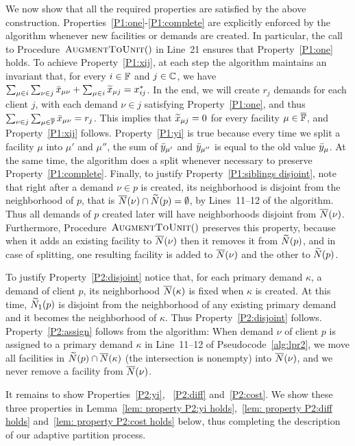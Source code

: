 \documentclass[11pt]{article}
\begin{document}
  We now show that all the
required properties are satisfied by the above construction.
Properties~\ref{P1:one}-\ref{P1:complete} are explicitly
enforced by the algorithm whenever new facilities or demands
are created. In particular, the call to
Procedure~${\textsc{AugmentToUnit}}()$ in Line~21 ensures that
Property~\ref{P1:one} holds. To achieve
Property~\ref{P1:xij}, at each step the algorithm maintains
an invariant that, for every $i\in\mathbb{F}$ and
$j\in\mathbb{C}$, we have $\sum_{\mu\in i}\sum_{\nu \in j}
{\bar x}_{\mu \nu} + \sum_{\mu\in i} {\widetilde x}_{\mu j} =
x_{ij}^\ast$. In the end, we will create $r_j$ demands for
each client $j$, with each demand $\nu\in j$ satisfying Property~\ref{P1:one},
and thus $\sum_{\nu\in j}\sum_{\mu\in\overline{\mathbb{F}}}{\bar x}_{\mu\nu}=r_j$.
This implies that ${\widetilde x}_{\mu j}=0$
for every facility $\mu\in\overline{\mathbb{F}}$, and
Property~\ref{P1:xij} follows.  Property~\ref{P1:yi} is true
because every time we split a facility $\mu$ into $\mu'$ and
$\mu''$, the sum of ${\bar y}_{\mu'}$ and ${\bar y}_{\mu''}$ is
equal to the old value ${\bar y}_{\mu}$. At the same time, the
algorithm does a split whenever necessary to preserve
Property~\ref{P1:complete}.  Finally, to justify
Property~\ref{P1:siblings disjoint}, note that right after a
demand $\nu\in p$ is created, its neighborhood is disjoint
from the neighborhood of $p$, that is ${\overline{N}}(\nu)\cap
{\widetilde N}(p) = \emptyset$, by Lines~11--12 of the
algorithm. Thus all demands of $p$ created later will have
neighborhoods disjoint from ${\overline{N}}(\nu)$. Furthermore,
Procedure~${\textsc{AugmentToUnit}}()$ preserves this property,
because when it adds an existing facility to ${\overline{N}}(\nu)$ then it removes it
from ${\widetilde N}(p)$, and in case of splitting, one resulting facility
is added to ${\overline{N}}(\nu)$ and the other to ${\widetilde N}(p)$.

To justify Property~\ref{P2:disjoint} notice that, for each
primary demand $\kappa$, a demand of client $p$, its
neighborhood ${\overline{N}}(\kappa)$ is fixed when $\kappa$ is
created. At this time, ${\widetilde N}_1(p)$ is disjoint from the
neighborhood of any existing primary demand and it becomes
the neighborhood of $\kappa$.  Thus
Property~\ref{P2:disjoint} follows.
Property~\ref{P2:assign} follows from the algorithm: When
demand $\nu$ of client $p$ is assigned to a primary demand
$\kappa$ in Line~11--12 of Pseudocode~\ref{alg:lpr2}, we
move all facilities in ${\widetilde N}(p)\cap {\overline{N}}(\kappa)$ (the
intersection is nonempty) into ${\overline{N}}(\nu)$, and we never
remove a facility from ${\overline{N}}(\nu)$.

It remains to show Properties~\ref{P2:yi},~ \ref{P2:diff}
and~\ref{P2:cost}. We show these three properties in
Lemma~\ref{lem: property P2:yi holds},~\ref{lem: property
  P2:diff holds} and~\ref{lem: property P2:cost holds}
below, thus completing the description of our adaptive
partition process.
\end{document}

